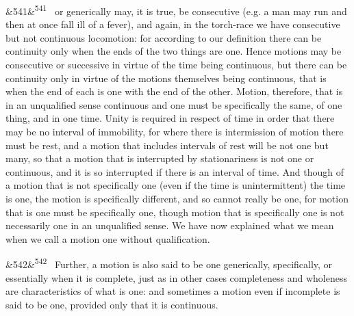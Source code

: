 \documentclass[12pt]{article}
\newcommand{\para}[1][]{\par\noindent\ifx&#1&\else\textsuperscript{\footnotesize #1}~\fi}
\begin{document}
\para[541] or generically may, it is true, be consecutive (e.g. a man may run and then at once fall ill of a fever), and again, in the torch-race we have consecutive but not continuous locomotion: for according to our definition there can be continuity only when the ends of the two things are one. Hence motions may be consecutive or successive in virtue of the time being continuous, but there can be continuity only in virtue of the motions themselves being continuous, that is when the end of each is one with the end of the other. Motion, therefore, that is in an unqualified sense continuous and one must be specifically the same, of one thing, and in one time. Unity is required in respect of time in order that there may be no interval of immobility, for where there is intermission of motion there must be rest, and a motion that includes intervals of rest will be not one but many, so that a motion that is interrupted by stationariness is not one or continuous, and it is so interrupted if there is an interval of time. And though of a motion that is not specifically one (even if the time is unintermittent) the time is one, the motion is specifically different, and so cannot really be one, for motion that is one must be specifically one, though motion that is specifically one is not necessarily one in an unqualified sense. We have now explained what we mean when we call a motion one without qualification.

\para[542] Further, a motion is also said to be one generically, specifically, or essentially when it is complete, just as in other cases completeness and wholeness are characteristics of what is one: and sometimes a motion even if incomplete is said to be one, provided only that it is continuous.
\end{document}
